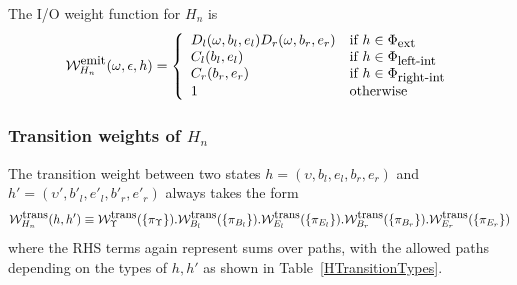 \documentclass{article}
\newcommand\idfork{\Upsilon}
\newcommand\States{\Phi}
\newcommand\statesof[1]{\States_{#1}}
\newcommand\weight{{\cal W}}
\newcommand\weightfunof[1]{\weight_{#1}}
\newcommand\transweightfun[1]{\weightfunof{#1}^{\mbox{\small trans}}}
\newcommand\emitweightfun[1]{\weightfunof{#1}^{\mbox{\small emit}}}
\newcommand\sumoverpaths[1]{\transweightfun{#1}(\{\pi_{#1}\})}
\newcommand\stateset[1]{\statesof{\mbox{\small #1}}}
\newcommand\hstate{(\upsilon,b_l,e_l,b_r,e_r)}
\newcommand\hstatedest{(\upsilon',b'_l,e'_l,b'_r,e'_r)}
\newcommand\externalsuffix{ext}
\newcommand\leftsuffix{left-int}
\newcommand\rightsuffix{right-int}
\newcommand\externalcascades{\stateset{\externalsuffix}}
\newcommand\leftcascades{\stateset{\leftsuffix}}
\newcommand\rightcascades{\stateset{\rightsuffix}}
\begin{document}
The I/O weight function for $H_n$ is
\[
\emitweightfun{H_n}(\omega,\epsilon,h) = \left\{
\begin{array}{ll}
D_l(\omega,b_l,e_l) D_r(\omega,b_r,e_r)
 & \mbox{if $h \in \externalcascades$} \\
C_l(b_l,e_l)
 & \mbox{if $h \in \leftcascades$} \\
C_r(b_r,e_r)
 & \mbox{if $h \in \rightcascades$} \\
1
 & \mbox{otherwise}
\end{array}
\right.
\]

\subsubsection{Transition weights of $H_n$}

The transition weight between two states
$h=\hstate$ and
$h'=\hstatedest$
always takes the form
\[
\transweightfun{H_n}(h,h') \equiv \sumoverpaths{\idfork} . \sumoverpaths{B_l} . \sumoverpaths{E_l} . \sumoverpaths{B_r} . \sumoverpaths{E_r}
\]
where the RHS terms again represent sums over paths, with the allowed paths depending on the types of $h,h'$ as shown in Table~\ref{HTransitionTypes}.
\end{document}
